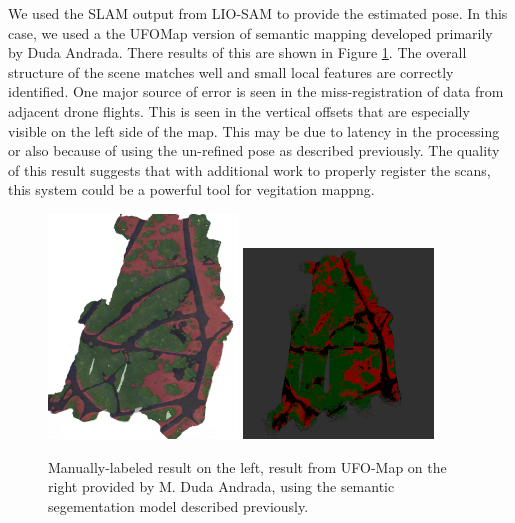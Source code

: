 We used the SLAM output from LIO-SAM to provide the estimated pose. In this case, we used a the UFOMap version of semantic mapping developed primarily by Duda Andrada. There results of this are shown in Figure \ref{fig:results:semantic_map_UFO}. The overall structure of the scene matches well and small local features are correctly identified. One major source of error is seen in the miss-registration of data from adjacent drone flights. This is seen in the vertical offsets that are especially visible on the left side of the map. This may be due to latency in the processing or also because of using the un-refined pose as described previously. The quality of this result suggests that with additional work to properly register the scans, this system could be a powerful tool for vegitation mappng. 

\begin{figure}
    \centering
    \includegraphics[width=0.45\textwidth]{figs/results/semantic_mapping/labeled_orthomoasaic.png}
    \includegraphics[width=0.45\textwidth]{figs/results/semantic_mapping/segnext_gc5_ufomap.png}
    \caption{Manually-labeled result on the left, result from UFO-Map on the right provided by M. Duda Andrada, using the semantic segementation model described previously. }
    \label{fig:results:semantic_map_UFO}
\end{figure}


